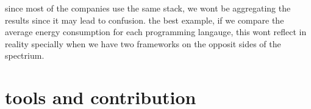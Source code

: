 since most of the companies use the same stack, we wont be aggregating the results since it may lead to confusion.
the best example, if we compare the average energy consumption for each programming langauge, this wont reflect in reality specially when we have two frameworks on the opposit sides of the spectrium.


\section{tools and contribution}

